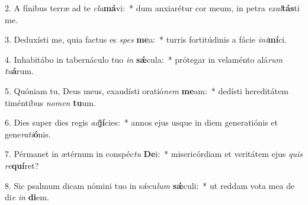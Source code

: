 2. A fínibus terræ ad te \textit{cla}\textbf{má}vi:~*  dum anxiarétur cor meum, in petra \textit{ex}\textit{al}\textbf{tás}ti me.\

3. Deduxísti me, quia factus es \textit{spes} \textbf{me}a:~*  turris fortitúdinis a fácie \textit{in}\textit{i}\textbf{mí}ci.\

4. Inhabitábo in tabernáculo tuo \textit{in} \textbf{sǽ}cula:~*  prótegar in velaménto alá\textit{rum} \textit{tu}\textbf{á}rum.\

5. Quóniam tu, Deus meus, exaudísti oratió\textit{nem} \textbf{me}am:~*  dedísti hereditátem timéntibus \textit{no}\textit{men} \textbf{tu}um.\

6. Dies super dies regis \textit{ad}\textbf{jí}cies:~*  annos ejus usque in diem generatiónis et gene\textit{ra}\textit{ti}\textbf{ó}nis.\

7. Pérmanet in ætérnum in conspéc\textit{tu} \textbf{De}i:~*  misericórdiam et veritátem ejus \textit{quis} \textit{re}\textbf{quí}ret?\

8. Sic psalmum dicam nómini tuo in sǽcu\textit{lum} \textbf{sǽ}culi:~*  ut reddam vota mea de di\textit{e} \textit{in} \textbf{di}em.\


